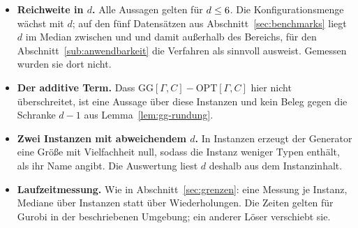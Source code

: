 \begin{itemize}
  \item \textbf{Reichweite in $d$.} Alle Aussagen gelten für $d \le 6$. Die
    Konfigurationsmenge wächst mit $d$; auf den fünf Datensätzen aus
    Abschnitt~\ref{sec:benchmarks} liegt $d$ im Median zwischen \HmDBenchMedianMin{} und
    \HmDBenchMedianMax{} und damit außerhalb des Bereichs, für den
    Abschnitt~\ref{sub:anwendbarkeit} die Verfahren als sinnvoll ausweist. Gemessen wurden sie
    dort nicht.
  \item \textbf{Der additive Term.} Dass $\mathrm{GG}[\Gamma,C] - \mathrm{OPT}[\Gamma,C]$ hier
    \HmGGMaxUeberOpt{} nicht überschreitet, ist eine Aussage über diese Instanzen und kein Beleg
    gegen die Schranke $d-1$ aus Lemma~\ref{lem:gg-rundung}.
  \item \textbf{Zwei Instanzen mit abweichendem $d$.} In \HmDAbweichung{} Instanzen erzeugt der
    Generator eine Größe mit Vielfachheit null, sodass die Instanz weniger Typen enthält, als ihr
    Name angibt. Die Auswertung liest $d$ deshalb aus dem Instanzinhalt.
  \item \textbf{Laufzeitmessung.} Wie in Abschnitt~\ref{sec:grenzen}: eine Messung je Instanz,
    Mediane über Instanzen statt über Wiederholungen. Die Zeiten gelten für Gurobi in der
    beschriebenen Umgebung; ein anderer Löser verschiebt sie.
\end{itemize}
